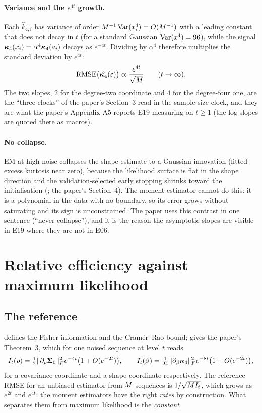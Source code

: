 \paragraph{Variance and the $e^{4t}$ growth.}
Each $\hat k_{4,i}$ has variance of order $M^{-1}\operatorname{Var}(x_i^4)=O(M^{-1})$ with a
leading constant that does not decay in $t$ (for a standard Gaussian $\operatorname{Var}(x^4)=96$),
while the signal $\bm{\kappa}_4(x_i)=\alpha^4\bm{\kappa}_4(a_i)$ decays as $e^{-4t}$. Dividing by
$\alpha^4$ therefore multiplies the standard deviation by $e^{4t}$:
\begin{equation}
  \mathrm{RMSE}\bigl(\hat{\bm{\kappa}_4}(\varepsilon)\bigr)\propto\frac{e^{4t}}{\sqrt{M}}
  \qquad(t\to\infty).
\end{equation}
The two slopes, $2$ for the degree-two coordinate and $4$ for the degree-four one, are
the ``three clocks'' of the paper's Section~3 read in the sample-size clock, and they
are what the paper's Appendix A5 reports E19 measuring on $t\ge1$ (the log-slopes are
quoted there as macros).

\paragraph{No collapse.}
EM at high noise collapses the shape estimate to a Gaussian innovation (fitted excess
kurtosis near zero), because the likelihood surface is flat in the shape direction and
the validation-selected early stopping shrinks toward the initialisation
(; the paper's Section~4). The moment estimator cannot do
this: it is a polynomial in the data with no boundary, so its error grows without
saturating and its sign is unconstrained. The paper uses this contrast in one sentence
(``never collapse''), and it is the reason the asymptotic slopes are visible in E19 where
they are not in E06.

\section{Relative efficiency against maximum likelihood}
\label{sec:mom-efficiency}

\subsection{The reference}

 defines the Fisher information and the Cram\'er--Rao bound;
 gives the paper's Theorem~3, which for one noised
sequence at level $t$ reads
\begin{equation}
  I_t(\rho)=\tfrac12\lVert \partial_\rho\mathbf{\Sigma}_0 \rVert_{F}^2e^{-4t}\bigl(1+O(e^{-2t})\bigr),
  \qquad
  I_t(\beta)=\tfrac1{24}\lVert \partial_\beta\bm{\kappa}_4 \rVert_{F}^2e^{-8t}\bigl(1+O(e^{-2t})\bigr),
\end{equation}
for a covariance coordinate and a shape coordinate respectively. The reference RMSE for
an unbiased estimator from $M$ sequences is $1/\sqrt{M I_t}$, which grows as
$e^{2t}$ and $e^{4t}$: the moment estimators have the right \emph{rates} by
construction. What separates them from maximum likelihood is the \emph{constant}.

